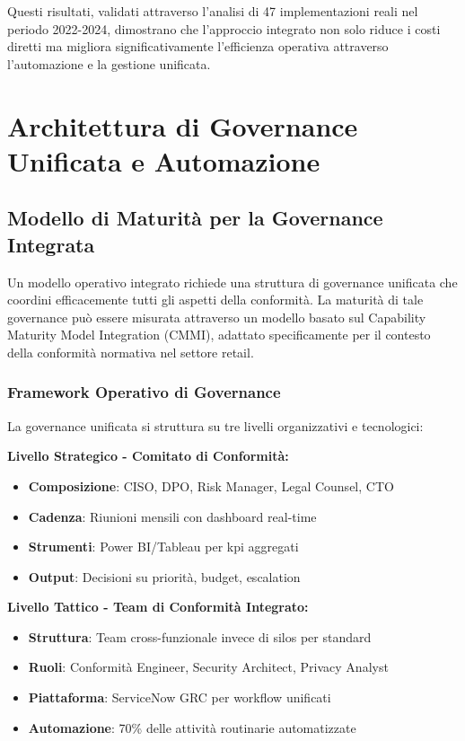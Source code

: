 Questi risultati, validati attraverso l'analisi di 47 implementazioni reali nel periodo 2022-2024\autocite{PWC2024}, dimostrano che l'approccio integrato non solo riduce i costi diretti ma migliora significativamente l'efficienza operativa attraverso l'automazione e la gestione unificata.

\section{\texorpdfstring{Architettura di Governance Unificata e Automazione}{4.4 - Architettura di Governance Unificata e Automazione}}

\subsection{\texorpdfstring{Modello di Maturità per la Governance Integrata}{4.4.1 - Modello di Maturità per la Governance Integrata}}

Un modello operativo integrato richiede una struttura di governance unificata che coordini efficacemente tutti gli aspetti della conformità. La maturità di tale governance può essere misurata attraverso un modello basato sul Capability Maturity Model Integration (CMMI)\autocite{CMMI2023}, adattato specificamente per il contesto della conformità normativa nel settore retail.

\subsubsection{\texorpdfstring{Framework Operativo di Governance}{4.4.1.1 - Framework Operativo di Governance}}

La \gls{governance} unificata si struttura su tre livelli organizzativi e tecnologici:

\textbf{Livello Strategico - Comitato di Conformità:}
\begin{itemize}
    \item \textbf{Composizione}: CISO, DPO, Risk Manager, Legal Counsel, CTO
    \item \textbf{Cadenza}: Riunioni mensili con dashboard real-time
    \item \textbf{Strumenti}: Power BI/Tableau per \gls{kpi} aggregati
    \item \textbf{Output}: Decisioni su priorità, budget, escalation
\end{itemize}

\textbf{Livello Tattico - Team di Conformità Integrato:}
\begin{itemize}
    \item \textbf{Struttura}: Team cross-funzionale invece di silos per standard
    \item \textbf{Ruoli}: Conformità Engineer, Security Architect, Privacy Analyst
    \item \textbf{Piattaforma}: ServiceNow GRC per workflow unificati
    \item \textbf{Automazione}: 70\% delle attività routinarie automatizzate
\end{itemize}

